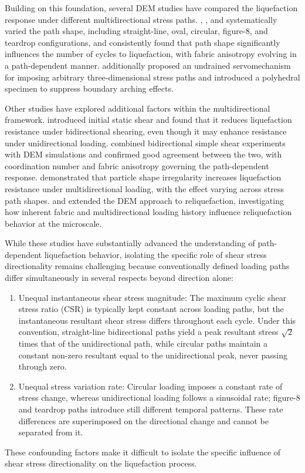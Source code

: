 Building on this foundation, several DEM studies have compared the liquefaction response under different multidirectional stress paths. \citet{Wei2020}, \citet{WuYang2021servo}, and \citet{Yang2022} systematically varied the path shape, including straight-line, oval, circular, figure-8, and teardrop configurations, and consistently found that path shape significantly influences the number of cycles to liquefaction, with fabric anisotropy evolving in a path-dependent manner. \citet{WuYang2021servo} additionally proposed an undrained servomechanism for imposing arbitrary three-dimensional stress paths and introduced a polyhedral specimen to suppress boundary arching effects.

Other studies have explored additional factors within the multidirectional framework. \citet{JiangXu2022} introduced initial static shear and found that it reduces liquefaction resistance under bidirectional shearing, even though it may enhance resistance under unidirectional loading. \citet{ZhangYang2021} combined bidirectional simple shear experiments with DEM simulations and confirmed good agreement between the two, with coordination number and fabric anisotropy governing the path-dependent response. \citet{XuPan2025} demonstrated that particle shape irregularity increases liquefaction resistance under multidirectional loading, with the effect varying across stress path shapes. \citet{YangHuang2023} and \citet{YangHuangJin2025} extended the DEM approach to reliquefaction, investigating how inherent fabric and multidirectional loading history influence reliquefaction behavior at the microscale.

While these studies have substantially advanced the understanding of path-dependent liquefaction behavior, isolating the specific role of shear stress directionality remains challenging because conventionally defined loading paths differ simultaneously in several respects beyond direction alone:
\begin{enumerate}
  \item Unequal instantaneous shear stress magnitude: The maximum cyclic shear stress ratio (CSR) is typically kept constant across loading paths, but the instantaneous resultant shear stress differs throughout each cycle. Under this convention, straight-line bidirectional paths \citep{WuYang2021servo,JiangXu2022,XuPan2025} yield a peak resultant stress $\sqrt{2}$ times that of the unidirectional path, while circular paths \citep{Wei2020,Yang2022} maintain a constant non-zero resultant equal to the unidirectional peak, never passing through zero.
  \item Unequal stress variation rate: Circular loading imposes a constant rate of stress change, whereas unidirectional loading follows a sinusoidal rate; figure-8 and teardrop paths \citep{WuYang2021servo,XuPan2025} introduce still different temporal patterns. These rate differences are superimposed on the directional change and cannot be separated from it.
\end{enumerate}
These confounding factors make it difficult to isolate the specific influence of shear stress directionality on the liquefaction process.

